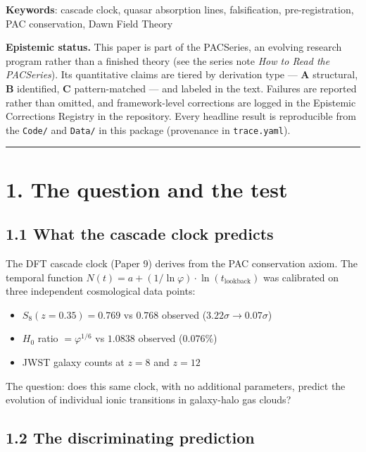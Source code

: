 \documentclass[11pt,a4paper]{article}
\providecommand{\tightlist}{\setlength{\itemsep}{0pt}\setlength{\parskip}{0pt}}
\begin{document}
\textbf{Keywords}: cascade clock, quasar absorption lines, falsification, pre-registration, PAC conservation, Dawn Field Theory

\textbf{Epistemic status.} This paper is part of the PACSeries, an evolving research program rather than a finished theory (see the series note \emph{How to Read the PACSeries}). Its quantitative claims are tiered by derivation type — \textbf{A} structural, \textbf{B} identified, \textbf{C} pattern-matched — and labeled in the text. Failures are reported rather than omitted, and framework-level corrections are logged in the Epistemic Corrections Registry in the repository. Every headline result is reproducible from the \texttt{Code/} and \texttt{Data/} in this package (provenance in \texttt{trace.yaml}).

\begin{center}\rule{0.5\linewidth}{0.4pt}\end{center}

\section*{1. The question and the test}

\subsection*{1.1 What the cascade clock predicts}

The DFT cascade clock (Paper 9) derives from the PAC conservation axiom. The temporal function $N(t) = a + (1/\ln\varphi) \cdot \ln(t_{\text{lookback}})$ was calibrated on three independent cosmological data points:

\begin{itemize}\tightlist
\item $S_8(z = 0.35) = 0.769$ vs $0.768$ observed ($3.22\sigma \to 0.07\sigma$)
\item $H_0$ ratio $= \varphi^{1/6}$ vs $1.0838$ observed ($0.076\%$)
\item JWST galaxy counts at $z = 8$ and $z = 12$
\end{itemize}

The question: does this same clock, with no additional parameters, predict the evolution of individual ionic transitions in galaxy-halo gas clouds?

\subsection*{1.2 The discriminating prediction}
\end{document}
